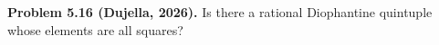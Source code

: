 \textbf{Problem 5.16 (Dujella, 2026).} Is there a rational Diophantine quintuple whose elements are all squares?
